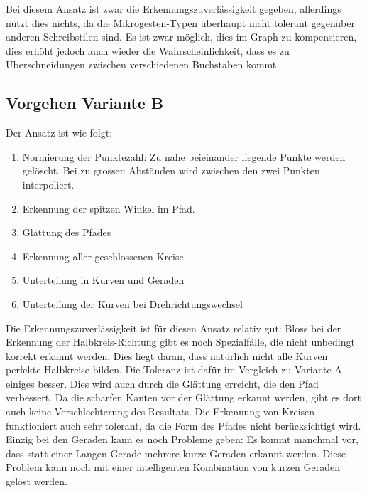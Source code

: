 Bei diesem Ansatz ist zwar die Erkennungszuverlässigkeit gegeben, allerdings nützt dies nichts, da die Mikrogesten-Typen überhaupt nicht tolerant gegenüber anderen Schreibstilen sind. Es ist zwar möglich, dies im Graph zu kompensieren, dies erhöht jedoch auch wieder die Wahrscheinlichkeit, dass es zu Überschneidungen zwischen verschiedenen Buchstaben kommt.

\subsection{Vorgehen Variante B}
Der Ansatz ist wie folgt:
\begin{enumerate}
	\item Normierung der Punktezahl: Zu nahe beieinander liegende Punkte werden gelöscht. Bei zu grossen Abständen wird zwischen den zwei Punkten interpoliert.
	\item Erkennung der spitzen Winkel im Pfad.
	\item Glättung des Pfades
	\item Erkennung aller geschlossenen Kreise 
	\item Unterteilung in Kurven und Geraden
	\item Unterteilung der Kurven bei Drehrichtungswechsel
\end{enumerate}

Die Erkennungszuverlässigkeit ist für diesen Ansatz relativ gut: Bloss bei der Erkennung der Halbkreis-Richtung gibt es noch Spezialfälle, die nicht unbedingt korrekt erkannt werden. Dies liegt daran, dass natürlich nicht alle Kurven perfekte Halbkreise bilden. Die Toleranz ist dafür im Vergleich zu Variante A einiges besser. Dies wird auch durch die Glättung erreicht, die den Pfad verbessert. Da die scharfen Kanten vor der Glättung erkannt werden, gibt es dort auch keine Verschlechterung des Resultats. Die Erkennung von Kreisen funktioniert auch sehr tolerant, da die Form des Pfades nicht berücksichtigt wird. Einzig bei den Geraden kann es noch Probleme geben: Es kommt manchmal vor, dass statt einer Langen Gerade mehrere kurze Geraden erkannt werden. Diese Problem kann noch mit einer intelligenten Kombination von kurzen Geraden gelöst werden.
